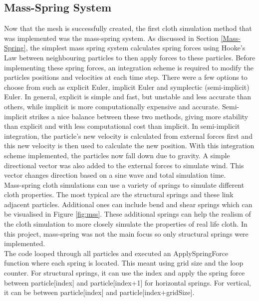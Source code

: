 \documentclass[12pt,a4paper]{article}
\begin{document}
\subsection{Mass-Spring System}
\label{mss-metho}
Now that the mesh is successfully created, the first cloth simulation method that was implemented was the mass-spring system. As discussed in Section \ref{Mass-Spring}, the simplest mass spring system calculates spring forces using Hooke's Law between neighbouring particles to then apply forces to these particles. Before implementing these spring forces, an integration scheme is required to modify the particles positions and velocities at each time step. There were a few options to choose from such as explicit Euler, implicit Euler and symplectic (semi-implicit) Euler. In general, explicit is simple and fast, but unstable and less accurate than others, while implicit is more computationally expensive and accurate. Semi-implicit strikes a nice balance between these two methods, giving more stability than explicit and with less computational cost than implicit. In semi-implicit integration, the particle's new velocity is calculated from external forces first and this new velocity is then used to calculate the new position. With this integration scheme implemented, the particles now fall down due to gravity. A simple directional vector was also added to the external forces to simulate wind. This vector changes direction based on a sine wave and total simulation time.
\\

Mass-spring cloth simulations can use a variety of springs to simulate different cloth properties. The most typical are the structural springs and these link adjacent particles. Additional ones can include bend and shear springs which can be visualised in Figure \ref{fig:mss}. These additional springs can help the realism of the cloth simulation to more closely simulate the properties of real life cloth. In this project, mass-spring was not the main focus so only structural springs were implemented.
\\

The code looped through all particles and executed an ApplySpringForce function where each spring is located. This meant using grid size and the loop counter. For structural springs, it can use the index and apply the spring force between particle[index] and particle[index+1] for horizontal springs. For vertical, it can be between particle[index] and particle[index+gridSize]. \\
\end{document}
